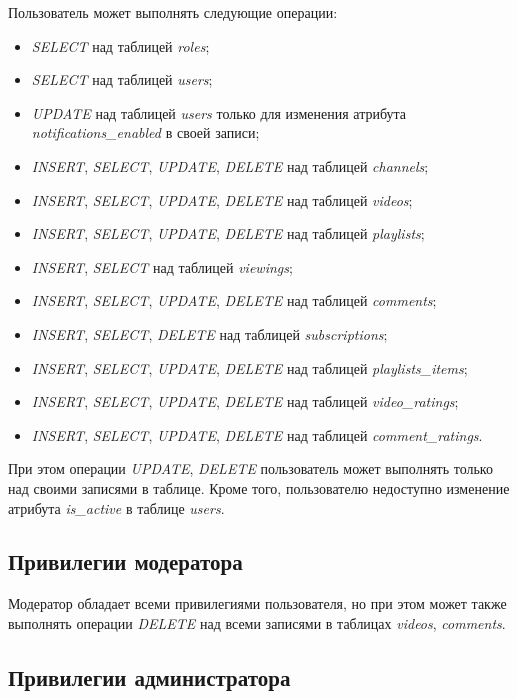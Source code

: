 Пользователь может выполнять следующие операции:
\begin{itemize}
    \item \textit{SELECT} над таблицей \textit{roles};
    \item \textit{SELECT} над таблицей \textit{users};
    \item \textit{UPDATE} над таблицей \textit{users} только для изменения атрибута \\ \textit{notifications\_enabled} в своей записи;
    \item \textit{INSERT}, \textit{SELECT}, \textit{UPDATE}, \textit{DELETE} над таблицей \textit{channels};
    \item \textit{INSERT}, \textit{SELECT}, \textit{UPDATE}, \textit{DELETE} над таблицей \textit{videos};
    \item \textit{INSERT}, \textit{SELECT}, \textit{UPDATE}, \textit{DELETE} над таблицей \textit{playlists};
    \item \textit{INSERT}, \textit{SELECT} над таблицей \textit{viewings};
    \item \textit{INSERT}, \textit{SELECT}, \textit{UPDATE}, \textit{DELETE} над таблицей \textit{comments};
    \item \textit{INSERT}, \textit{SELECT}, \textit{DELETE} над таблицей \textit{subscriptions};
    \item \textit{INSERT}, \textit{SELECT}, \textit{UPDATE}, \textit{DELETE} над таблицей \textit{playlists\_items};
    \item \textit{INSERT}, \textit{SELECT}, \textit{UPDATE}, \textit{DELETE} над таблицей \textit{video\_ratings};
    \item \textit{INSERT}, \textit{SELECT}, \textit{UPDATE}, \textit{DELETE} над таблицей \textit{comment\_ratings}.
\end{itemize}
При этом операции \textit{UPDATE}, \textit{DELETE} пользователь может выполнять только над своими записями в таблице.
Кроме того, пользователю недоступно изменение атрибута \textit{is\_active} в таблице \textit{users}.

\subsection*{Привилегии модератора}

Модератор обладает всеми привилегиями пользователя, но при этом может также выполнять операции \textit{DELETE} над всеми записями в таблицах \textit{videos}, \textit{comments}.

\subsection*{Привилегии администратора}

